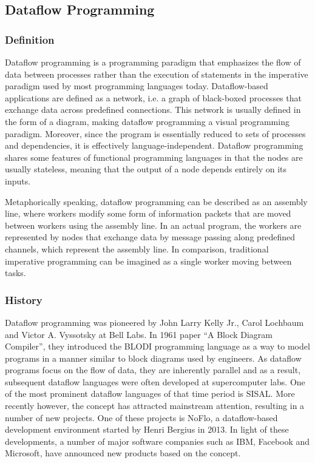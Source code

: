 \documentclass[11pt,a4paper]{globis-book}
\begin{document}
\subsection{Dataflow Programming}
\subsubsection*{Definition}
\label{sec:dfp}
Dataflow programming is a programming paradigm that emphasizes the flow of data between processes rather than the execution of statements in the imperative paradigm used by most programming languages today. Dataflow-based applications are defined as a network, i.e. a graph of black-boxed processes that exchange data across predefined connections. This network is usually defined in the form of a diagram, making dataflow programming a visual programming paradigm. Moreover, since the program is essentially reduced to sets of processes and dependencies, it is effectively language-independent. Dataflow programming shares some features of functional programming languages in that the nodes are usually stateless, meaning that the output of a node depends entirely on its inputs.

Metaphorically speaking, dataflow programming can be described as an assembly line, where workers modify some form of information packets that are moved between workers using the assembly line. In an actual program, the workers are represented by nodes that exchange data by message passing along predefined channels, which represent the assembly line. In comparison, traditional imperative programming can be imagined as a single worker moving between tasks.

\subsubsection*{History}
Dataflow programming was pioneered by John Larry Kelly Jr., Carol Lochbaum and Victor A. Vyssotsky at Bell Labs. In 1961 paper ``A Block Diagram Compiler''\cite{kelly1961block}, they introduced the BLODI programming language as a way to model programs in a manner similar to block diagrams used by engineers. As dataflow programs focus on the flow of data, they are inherently parallel and as a result, subsequent dataflow languages were often developed at supercomputer labs. One of the most prominent dataflow languages of that time period is SISAL. More recently however, the concept has attracted mainstream attention, resulting in a number of new projects. One of these projects is NoFlo, a dataflow-based development environment started by Henri Bergius in 2013. In light of these developments, a number of major software companies such as IBM, Facebook and Microsoft, have announced new products based on the concept.
\end{document}
